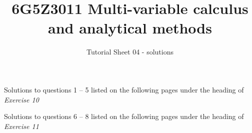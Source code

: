 \documentclass[a4paper]{amsart}
\begin{document}
\title{6G5Z3011 Multi-variable calculus and analytical methods}
\author{Tutorial Sheet 04 - solutions}
\maketitle

Solutions to questions 1 -- 5 listed on the following pages under the heading of \textit{Exercise 10}

Solutions to questions 6 -- 8 listed on the following pages under the heading of \textit{Exercise 11}



\end{document}
